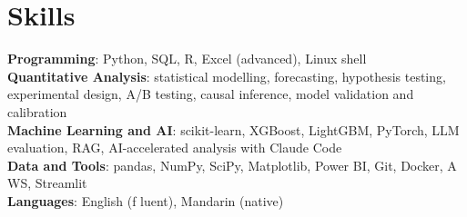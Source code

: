 \documentclass[letterpaper,11pt]{article}
\begin{document}
\section{\textbf{Skills}}
 \begin{itemize}[leftmargin=0.15in, label={}]
    \small{\item{
     \textbf{Programming}{: Python, SQL, R, Excel (advanced), Linux shell} \\
     \textbf{Quantitative Analysis}{: statistical modelling, forecasting, hypothesis testing, experimental design, A/B testing, causal inference, model validation and calibration} \\
     \textbf{Machine Learning and AI}{: scikit-learn, XGBoost, LightGBM, PyTorch, LLM evaluation, RAG, AI-accelerated analysis with Claude Code} \\
     \textbf{Data and Tools}{: pandas, NumPy, SciPy, Matplotlib, Power BI, Git, Docker, A\kern0pt WS, Streamlit} \\
     \textbf{Languages}{: English (f\kern0pt luent), Mandarin (native)}}}

 \end{itemize}
\end{document}
